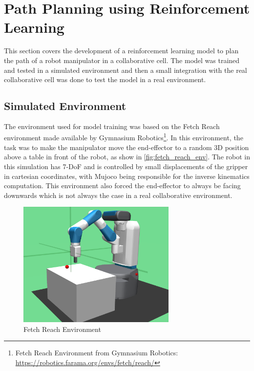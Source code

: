 \section{Path Planning using Reinforcement Learning}

This section covers the development of a reinforcement learning model to plan the path of a robot manipulator in a collaborative cell. The model was trained and tested in a simulated environment and then a small integration with the real collaborative cell was done to test the model in a real environment.

\subsection{Simulated Environment}

The environment used for model training was based on the Fetch Reach environment made available by Gymnasium Robotics\footnote{Fetch Reach Environment from Gymnasium Robotics: \url{https://robotics.farama.org/envs/fetch/reach/}}. In this environment, the task was to make the manipulator move the end-effector to a random 3D position above a table in front of the robot, as show in \autoref{fig:fetch_reach_env}. The robot in this simulation has 7-DoF and is controlled by small displacements of the gripper in cartesian coordinates, with Mujoco being responsible for the inverse kinematics computation. This environment also forced the end-effector to always be facing downwards which is not always the case in a real collaborative environment.

\begin{figure}[H]%
    \centerline{\includegraphics[width=0.7\textwidth]{figs/fetch_reach.png}}
    \caption[Fetch Reach Environment]{Fetch Reach Environment}
    \label{fig:fetch_reach_env}
\end{figure}

